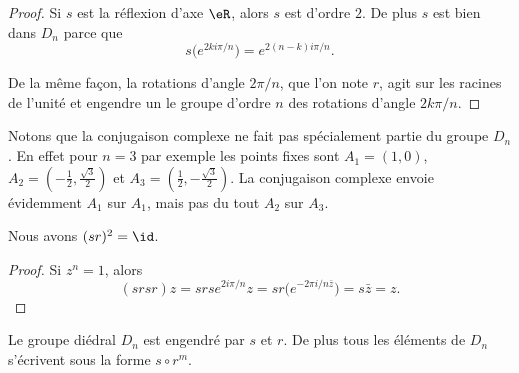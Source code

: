 \begin{proof}
    Si \( s\) est la réflexion d'axe \( \eR\), alors \( s\) est d'ordre \( 2\). De plus \( s\) est bien dans \( D_n\) parce que
    \begin{equation}    \label{EqSUshknP}
        s\big(  e^{2ki\pi/n} \big)= e^{2(n-k)i\pi/n}.
    \end{equation}

    De la même façon, la rotations d'angle \(2\pi/n\), que l'on note \( r\), agit sur les racines de l'unité et engendre un le groupe d'ordre \( n\) des rotations d'angle \(2 k\pi/n\).
\end{proof}

Notons que la conjugaison complexe ne fait pas spécialement partie du groupe \( D_n\). En effet pour \( n=3\) par exemple les points fixes sont \( A_1=(1,0)\), \( A_2=(-\frac{ 1 }{2},\frac{ \sqrt{3} }{2})\) et \( A_3=(\frac{ 1 }{2},-\frac{ \sqrt{3} }{2})\). La conjugaison complexe envoie évidemment \( A_1\) sur \( A_1\), mais pas du tout \( A_2\) sur \( A_3\).

\begin{proposition}
    Nous avons \( (sr)^2=\id\).
\end{proposition}

\begin{proof}
    Si \( z^n=1\), alors
    \begin{equation}
        (srsr)z=srs e^{2 i\pi/n}z=sr\big( e^{-2\pi i/n\bar z}\big)=s\bar z=z.
    \end{equation}
\end{proof}

\begin{proposition} \label{PropLDIPoZ}
    Le groupe diédral \( D_n\) est engendré par \( s\) et \( r\). De plus tous les éléments de \( D_n\) s'écrivent sous la forme \( s\circ r^m\).
\end{proposition}

